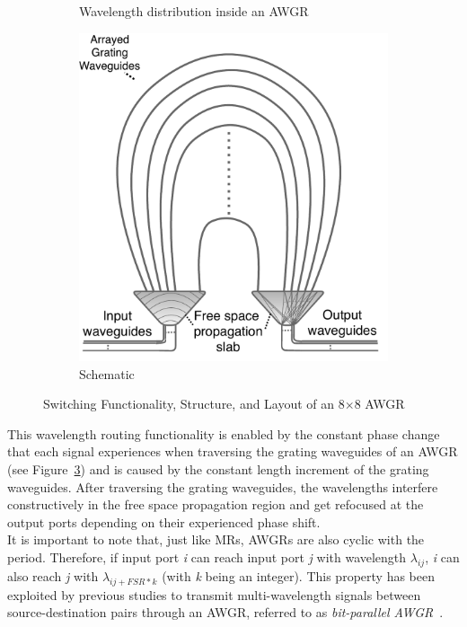 \begin{figure}[t!]
\begin{subfigure}[t]{0.46\linewidth}
        \caption{Wavelength distribution inside an AWGR}
        		\label{fig:awgrmatrix}
    \end{subfigure}
        \hspace{0.4cm}
    \begin{subfigure}[t]{0.28\linewidth}
        \includegraphics[width=\textwidth, clip]{Figures/awgrschematic.pdf}
        \caption{Schematic}
        		\label{fig:awgrcartoon}
    \end{subfigure}
    \caption[AWGR Structure and Switching Functionality]{Switching Functionality, Structure, and Layout of an 8$\times$8 AWGR}
\end{figure}
This wavelength routing functionality is enabled by the constant phase change that each signal experiences when traversing the grating waveguides of an AWGR (see Figure~\ref{fig:awgrcartoon}) and is caused by the constant length increment of the grating waveguides. After traversing the grating waveguides, the wavelengths interfere constructively in the free space propagation region and get refocused at the output ports depending on their experienced phase shift.\\
It is important to note that, just like MRs, AWGRs are also cyclic with the period. Therefore, if input port \textit{i} can reach input port \textit{j} with wavelength $\lambda_{ij}$, \textit{i} can also reach \textit{j} with $\lambda_{ij + FSR*k}$ (with \textit{k} being an integer). This property has been exploited by previous studies to transmit multi-wavelength signals between source-destination pairs through an AWGR, referred to as \textit{bit-parallel AWGR}~\cite{grani2017bit}. 

